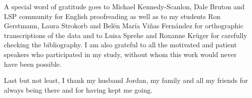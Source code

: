 A special word of gratitude goes to Michael Kennedy-Scanlon, Dale Bruton and LSP community for English proofreading as well as to my students Ron Gerstmann, Laura Strokorb and Belén María Viñas Fernández for orthographic transcriptions of the data and to Luisa Sprehe and Roxanne Krüger for carefully checking the bibliography. I am also grateful to all the motivated and patient speakers who participated in my study, without whom this work would never have been possible.



Last but not least, I thank my husband Jordan, my family and all my friends for always being there and for having kept me going.
